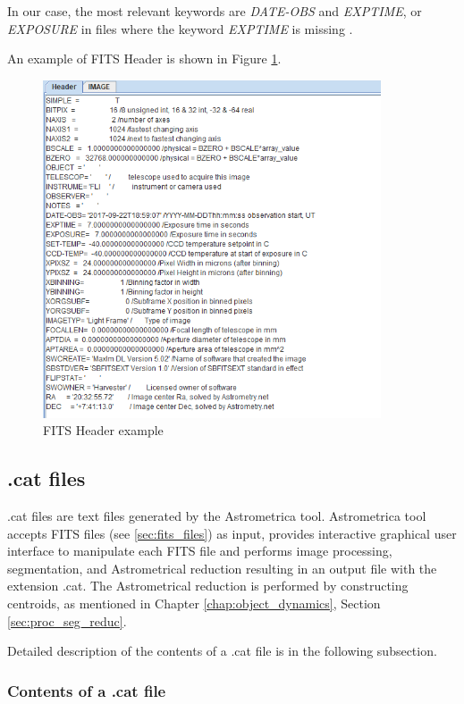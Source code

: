 	 In our case, the most relevant keywords are \emph{DATE-OBS} and \emph{EXPTIME}, or \emph{EXPOSURE} in files where the keyword \emph{EXPTIME} is missing \citep{FITSdefinition}.
	 
	 An example of FITS Header is shown in Figure \ref{fig:fits_header}.
	
	\begin{figure}[H]
	\centering
	  \includegraphics[width=10cm]{images/fits_header_example}
		  \caption{FITS Header example}
	  \label{fig:fits_header}
	\end{figure}

\subsection{.cat files}\label{sec:cat_files}
	
	.cat files are text files generated by the Astrometrica tool. Astrometrica tool accepts FITS files (see \ref{sec:fits_files}) as input, provides interactive graphical user interface to manipulate each FITS file and performs image processing, segmentation, and Astrometrical reduction resulting in an output file with the extension .cat. The Astrometrical reduction is performed by constructing centroids, as mentioned in Chapter \ref{chap:object_dynamics}, Section \ref{sec:proc_seg_reduc}.
	
	 Detailed description of the contents of a .cat file is in the following subsection.
	
\subsubsection{Contents of a .cat file}\label{subsubsec:content_cat}
	
